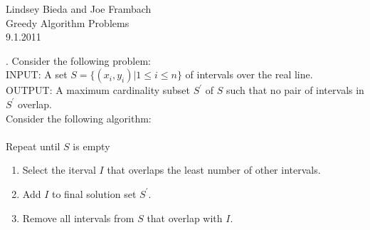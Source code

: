 \documentclass[10pt]{article}
\begin{document}
	\begin{flushright}
	Lindsey Bieda and Joe Frambach\\
	Greedy Algorithm Problems\\
	9.1.2011
	\end{flushright}
	. Consider the following problem:\\ 
	INPUT: A set $ S = \{(x_{i},y_{i})| 1\leq i \leq n\} $ of intervals over the real line.\\
	OUTPUT: A maximum cardinality subset $S^{\prime}$ of $S$ such that no pair of intervals in $S^{\prime}$ overlap. \\
	Consider the following algorithm:\\
	\\
	Repeat until $S$ is empty
	\begin{enumerate}
		\item Select the iterval $I$ that overlaps the least number of other intervals.
		\item Add $I$ to final solution set $S^{\prime}$.
		\item Remove all intervals from $S$ that overlap with $I$.
	\end{enumerate}
	
\end{document}
